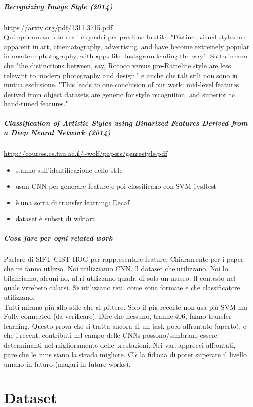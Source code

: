 \documentclass{article}
\begin{document}
\subparagraph{Recognizing Image Style (2014)}
\url{https://arxiv.org/pdf/1311.3715.pdf} \\
Qui operano su foto reali e quadri per predirne lo stile. "Distinct visual styles are apparent in art, cinematography, advertising, and have become extremely popular in amateur photography, with apps like Instagram leading the way". Sottolineano che "the distinctions between, say, Rococo versus pre-Rafaelite style are less relevant to modern photography and design." e anche che tali stili non sono in mutua esclusione. "This leads to one
conclusion of our work: mid-level features derived from object datasets are generic for style
recognition, and superior to hand-tuned features."

\subparagraph{Classification of Artistic Styles using Binarized
	Features Derived from a Deep Neural Network (2014)}\url{http://courses.cs.tau.ac.il/~wolf/papers/genrestyle.pdf}\\
\begin{itemize}
	\item stanno sull'identificazione dello stile
	\item usan CNN per generare feature e poi classificano con SVM 1vsRest
	\item è una sorta di transfer learning: Decaf
	\item dataset è subset di wikiart
\end{itemize}

\subparagraph{Cosa fare per ogni related work}

Parlare di SIFT-GIST-HOG per rappresentare feature. Chiaramente per i paper che ne fanno utlizzo. Noi utilizziamo CNN. Il dataset che utilizzano. Noi lo bilanciamo, alcuni no, altri utilizzano quadri di solo un museo. Il contesto nel quale vrrebero calarsi. Se utilizzano reti, come sono formate e che classificatore utilizzano. \\
Tutti mirano più allo stile che al pittore. Solo il più recente non usa più SVM ma Fully connected (da verificare). Dire che nessuno, tranne 406, fanno transfer learning. Questo prova che si tratta ancora di un task poco affrontato (aperto), e che i recenti contributi nel campo delle CNNs possono/sembrano essere determinanti nel miglioramento delle prestazioni. Nei vari approcci affrontati, pare che le cnns siano la strada migliore. C'è la fiducia di poter superare il livello umano in futuro (magari in future works).


\section{Dataset}\label{dataset}
\end{document}
